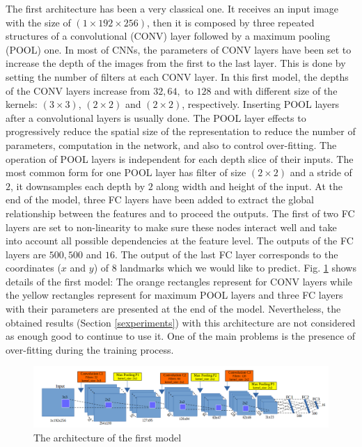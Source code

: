 \documentclass[review]{elsarticle}
\begin{document}
The first architecture has been a very classical one. It receives an input image with the size of $(1 \times 192 \times 256)$, then it is composed by three repeated structures of a convolutional (CONV) layer followed by a maximum pooling (POOL) one. In most of CNNs, the parameters of CONV layers have been set to increase the depth of the images from the first  to the last layer. This is done by setting the number of filters at each CONV layer. In this first model, the depths of the CONV layers increase from $32, 64, $ to $128$ and with different size of the kernels: $(3 \times 3)$, $(2 \times 2)$ and $(2 \times 2)$, respectively. Inserting POOL layers after a convolutional layers is usually done. The POOL layer effects to progressively reduce the spatial size of the representation to reduce the number of parameters, computation in the network, and also to control over-fitting. The operation of POOL layers is independent for each depth slice of their inputs. The most common form for one POOL layer has filter of size $(2 \times 2)$ and a stride of $2$, it downsamples each depth by $2$ along width and height of the input. At the end of the model, three FC layers have been added to extract the global relationship between the features and to proceed the outputs. The first of two FC layers are set to non-linearity to make sure these nodes interact well and take into account all possible dependencies at the feature level. The outputs of the FC layers are $500, 500$ and $16$. The output of the last FC layer corresponds to the coordinates ($x$ and $y$) of $8$ landmarks which we would like to predict. Fig. \ref{fignet1} shows details of the first model: The orange rectangles represent for CONV layers while the yellow rectangles represent for maximum POOL layers and three FC layers with their parameters are presented at the end of the model. Nevertheless, the obtained results (Section \ref{sexperiments}) with this architecture are not considered as enough good to continue to use it. One of the main problems is the presence of over-fitting during the training process.

\begin{figure}[!h]
	\centering
	\includegraphics[scale=0.3]{images/net1}
	\caption{The architecture of the first model}
	\label{fignet1}
\end{figure}
\end{document}
